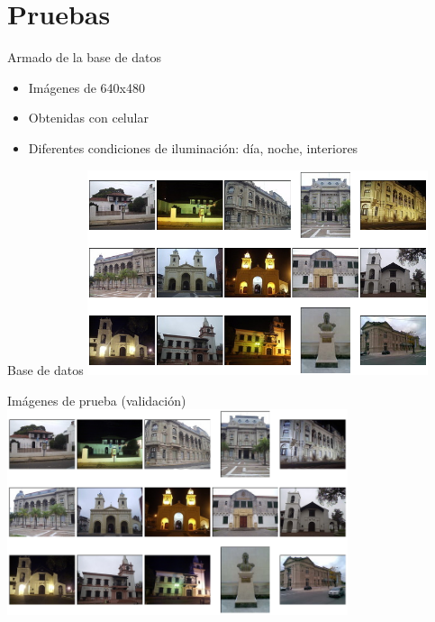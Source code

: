 \documentclass[spanish]{beamer}
\begin{document}
\section{Pruebas}
%
\begin{frame}{Armado de la base de datos}
  \begin{itemize}
  \item Imágenes de 640x480
  \item Obtenidas con celular
  \item Diferentes condiciones de iluminación: día, noche, interiores
  \end{itemize}
\end{frame}
%
\begin{frame}{Base de datos}
  \includegraphics[width=10cm]{img/mosaico.png}
\end{frame}
%
\begin{frame}{Imágenes de prueba (validación)}
  \includegraphics[width=10cm]{img/pruebas.png}
\end{frame}
\end{document}
